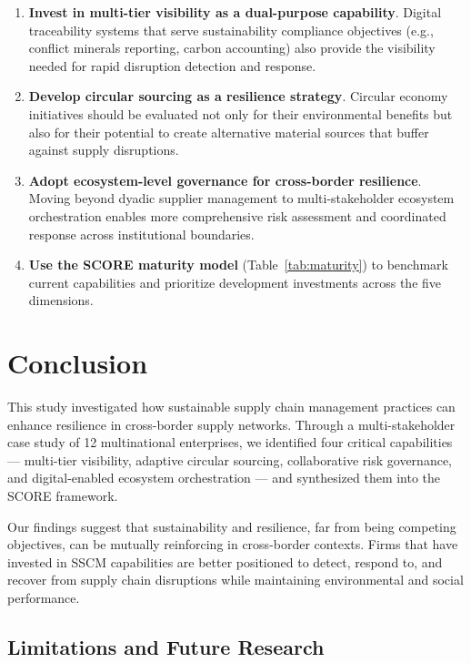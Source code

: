 \documentclass[12pt,a4paper,twoside]{article}
\begin{document}
\begin{enumerate}
  \item \textbf{Invest in multi-tier visibility as a dual-purpose capability}.
        Digital traceability systems that serve sustainability compliance
        objectives (e.g., conflict minerals reporting, carbon accounting) also
        provide the visibility needed for rapid disruption detection and
        response.
  \item \textbf{Develop circular sourcing as a resilience strategy}.
        Circular economy initiatives should be evaluated not only for their
        environmental benefits but also for their potential to create
        alternative material sources that buffer against supply disruptions.
  \item \textbf{Adopt ecosystem-level governance for cross-border resilience}.
        Moving beyond dyadic supplier management to multi-stakeholder ecosystem
        orchestration enables more comprehensive risk assessment and coordinated
        response across institutional boundaries.
  \item \textbf{Use the SCORE maturity model} (Table~\ref{tab:maturity}) to
        benchmark current capabilities and prioritize development investments
        across the five dimensions.
\end{enumerate}

\section{Conclusion}
\label{sec:conclusion}

This study investigated how sustainable supply chain management practices can
enhance resilience in cross-border supply networks.  Through a multi-stakeholder
case study of 12 multinational enterprises, we identified four critical
capabilities --- multi-tier visibility, adaptive circular sourcing,
collaborative risk governance, and digital-enabled ecosystem orchestration ---
and synthesized them into the SCORE framework.

Our findings suggest that sustainability and resilience, far from being
competing objectives, can be mutually reinforcing in cross-border contexts.
Firms that have invested in SSCM capabilities are better positioned to detect,
respond to, and recover from supply chain disruptions while maintaining
environmental and social performance.

\subsection{Limitations and Future Research}
\end{document}
